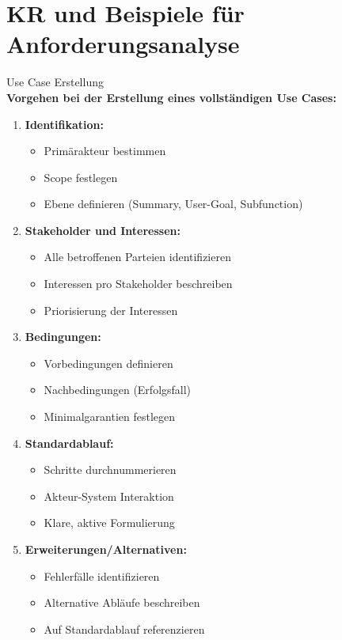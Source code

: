 \section{KR und Beispiele für Anforderungsanalyse}

\begin{KR}{Use Case Erstellung}\\
\textbf{Vorgehen bei der Erstellung eines vollständigen Use Cases:}
\begin{enumerate}
    \item \textbf{Identifikation:}
    \begin{itemize}
        \item Primärakteur bestimmen
        \item Scope festlegen
        \item Ebene definieren (Summary, User-Goal, Subfunction)
    \end{itemize}
    
    \item \textbf{Stakeholder und Interessen:}
    \begin{itemize}
        \item Alle betroffenen Parteien identifizieren
        \item Interessen pro Stakeholder beschreiben
        \item Priorisierung der Interessen
    \end{itemize}
    
    \item \textbf{Bedingungen:}
    \begin{itemize}
        \item Vorbedingungen definieren
        \item Nachbedingungen (Erfolgsfall)
        \item Minimalgarantien festlegen
    \end{itemize}
    
    \item \textbf{Standardablauf:}
    \begin{itemize}
        \item Schritte durchnummerieren
        \item Akteur-System Interaktion
        \item Klare, aktive Formulierung
    \end{itemize}
    
    \item \textbf{Erweiterungen/Alternativen:}
    \begin{itemize}
        \item Fehlerfälle identifizieren
        \item Alternative Abläufe beschreiben
        \item Auf Standardablauf referenzieren
    \end{itemize}
\end{enumerate}
\end{KR}

